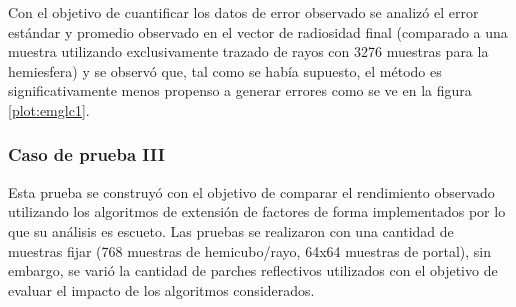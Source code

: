 Con el objetivo de cuantificar los datos de error observado se analizó el error estándar y promedio observado en el vector de radiosidad final (comparado a una muestra utilizando exclusivamente trazado de rayos con 3276 muestras para la hemiesfera) y se observó que, tal como se había supuesto, el método es significativamente menos propenso a generar errores como se ve en la figura \ref{plot:emglc1}.


\subsubsection{Caso de prueba III}

Esta prueba se construyó con el objetivo de comparar el rendimiento observado utilizando los algoritmos de extensión de factores de forma implementados por lo que su análisis es escueto. Las pruebas se realizaron con una cantidad de muestras fijar (768 muestras de hemicubo/rayo, 64x64 muestras de portal), sin embargo, se varió la cantidad de parches reflectivos utilizados con el objetivo de evaluar el impacto de los algoritmos considerados.

